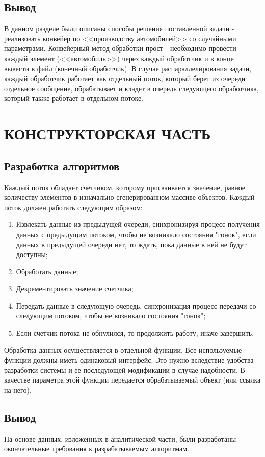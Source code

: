 \documentclass[a4paper,12pt]{article}
\begin{document}
\newpage
\subsection{Вывод}
В данном разделе были описаны способы решения поставленной задачи - реализовать конвейер по <<производству автомобилей>> со случайными параметрами. Конвейерный метод обработки прост - необходимо провести каждый элемент (<<автомобиль>>) через каждый обработчик и в конце вывести в файл (конечный обработчик). В случае распараллелирования задачи, каждый обработчик работает как отдельный поток, который берет из очереди отдельное сообщение, обрабатывает и кладет в очередь следующего обработчика, который также работает в отдельном потоке.

\newpage
\section{КОНСТРУКТОРСКАЯ ЧАСТЬ}
\subsection{Разработка алгоритмов}
Каждый поток обладает счетчиком, которому присваивается значение, равное количеству элементов в изначально сгенерированном массиве объектов. 
Каждый поток должен работать следующим образом:
\begin{enumerate}
\item Извлекать данные из предыдущей очереди, синхронизируя процесс получения данных с предыдущим потоком, чтобы не возникало состояния "гонок", если данных в предыдущей очереди нет, то ждать, пока данные в ней не будут доступны;
\item Обработать данные;
\item Декрементировать значение счетчика;
\item Передать данные в следующую очередь, синхронизация процесс передачи со следующим потоком, чтобы не возникало состояния "гонок";
\item Если счетчик потока не обнулился, то продолжить работу, иначе завершить.
\end{enumerate}

Обработка данных осуществляется в отдельной функции. Все используемые функции должны иметь одинаковый интерфейс. Это нужно вследствие удобства разработки системы и ее последующей модификации в случае надобности.
В качестве параметра этой функции передается обрабатываемый объект (или ссылка на него).

\newpage
\subsection{Вывод}
На основе данных, изложенных в аналитической части, были разработаны окончательные требования к разрабатываемым алгоритмам. 
\end{document}
